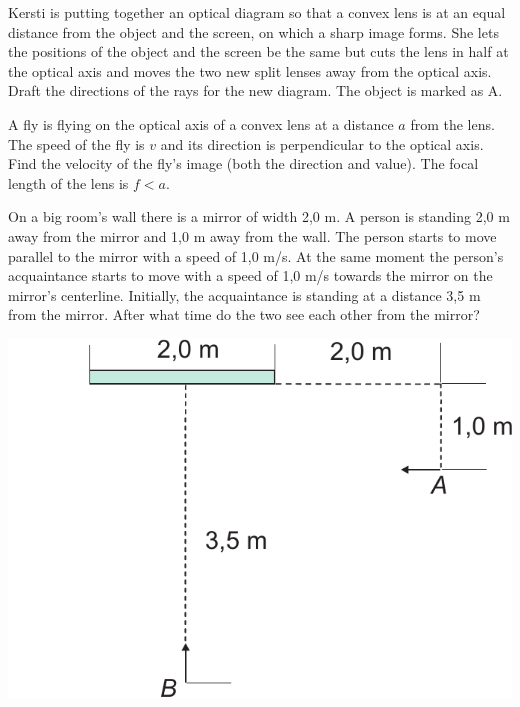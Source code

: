 \documentclass[11pt]{article}
\begin{document}
\probeng
Kersti is putting together an optical diagram so that a convex lens is at an equal distance from the object and the screen, on which a sharp image forms. She lets the positions of the object and the screen be the same but cuts the lens in half at the optical axis and moves the two new split lenses away from the optical axis. Draft the directions of the rays for the new diagram. The object is marked as A.
\begin{center}
\end{center}
\probend
\bigskip


\probeng
A fly is flying on the optical axis of a convex lens at a distance $a$ from the lens. The speed of the fly is $v$ and its direction is perpendicular to the optical axis. Find the velocity of the fly’s image (both the direction and value). The focal length of the lens is $f < a$.
\probend
\bigskip


\probeng
On a big room’s wall there is a mirror of width 2,0 m. A person is standing 2,0 m away from the mirror and 1,0 m away from the wall. The person starts to move parallel to the mirror with a speed of 1,0 m/s. At the same moment the person’s acquaintance starts to move with a speed of 1,0 m/s towards the mirror on the mirror’s centerline. Initially, the acquaintance is standing at a distance 3,5 m from the mirror. After what time do the two see each other from the mirror?
\begin{center}
\includegraphics[width=0.5\linewidth]{2012-v2g-01-peegel2}%
\end{center}
\probend
\bigskip
\end{document}
